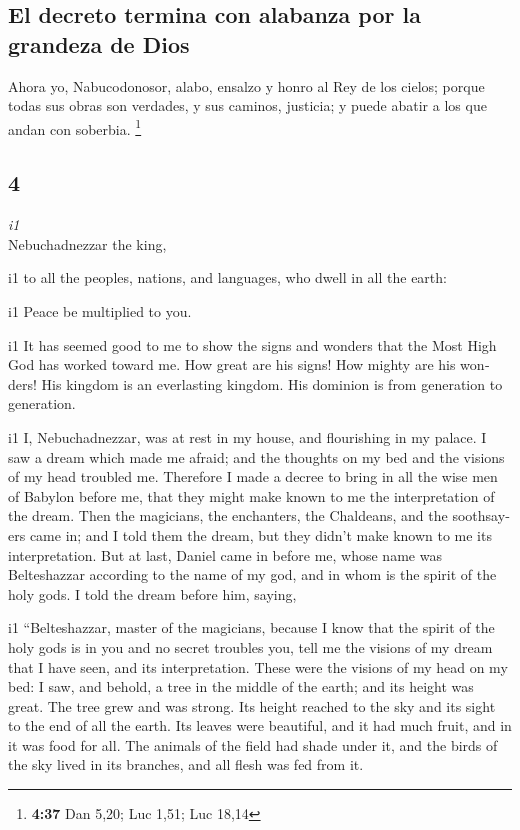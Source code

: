 \begin{paracol}{2}
\hypertarget{el-decreto-termina-con-alabanza-por-la-grandeza-de-dios}{%
\subsection{El decreto termina con alabanza por la grandeza de
Dios}\label{el-decreto-termina-con-alabanza-por-la-grandeza-de-dios}}

 Ahora yo, Nabucodonosor, alabo, ensalzo y honro al Rey
de los cielos; porque todas sus obras son verdades, y sus caminos,
justicia; y puede abatir a los que andan con soberbia. \footnote{\textbf{4:37}
  Dan 5,20; Luc 1,51; Luc 18,14}

\switchcolumn
\begin{otherlanguage}{english}

\hypertarget{section-7}{%
\section{4}\label{section-7}}

\emph{i1}\\
 Nebuchadnezzar the king,

i1 to all the peoples, nations, and languages, who dwell in all the
earth:

i1 Peace be multiplied to you.

i1  It has seemed good to me to show the signs and wonders
that the Most High God has worked toward me.  How great
are his signs! How mighty are his wonders! His kingdom is an everlasting
kingdom. His dominion is from generation to generation.

i1  I, Nebuchadnezzar, was at rest in my house, and
flourishing in my palace.  I saw a dream which made me
afraid; and the thoughts on my bed and the visions of my head troubled
me.  Therefore I made a decree to bring in all the wise
men of Babylon before me, that they might make known to me the
interpretation of the dream.  Then the magicians, the
enchanters, the Chaldeans, and the soothsayers came in; and I told them
the dream, but they didn't make known to me its interpretation.
 But at last, Daniel came in before me, whose name was
Belteshazzar according to the name of my god, and in whom is the spirit
of the holy gods. I told the dream before him, saying,

i1  ``Belteshazzar, master of the magicians, because I
know that the spirit of the holy gods is in you and no secret troubles
you, tell me the visions of my dream that I have seen, and its
interpretation.  These were the visions of my head on my
bed: I saw, and behold, a tree in the middle of the earth; and its
height was great.  The tree grew and was strong. Its
height reached to the sky and its sight to the end of all the earth.
 Its leaves were beautiful, and it had much fruit, and in
it was food for all. The animals of the field had shade under it, and
the birds of the sky lived in its branches, and all flesh was fed from
it.


\end{otherlanguage}
\end{paracol}
